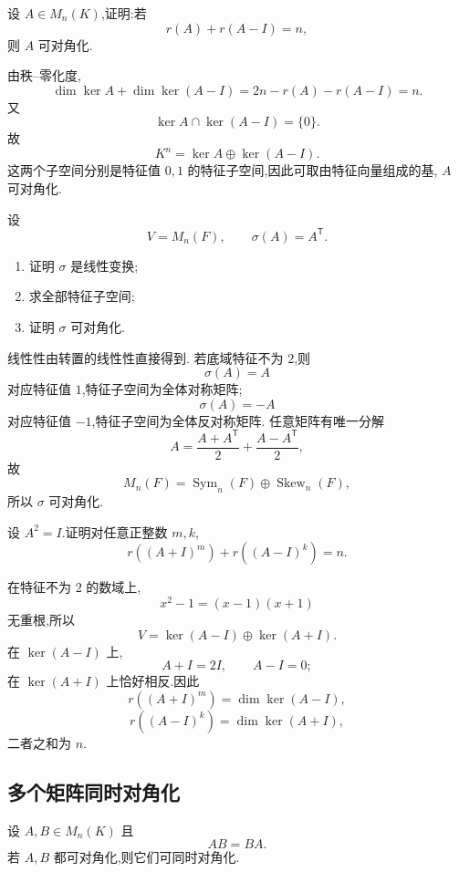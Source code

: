 \begin{example}
设 $A\in M_n(K)$,证明:若
\[
r(A)+r(A-I)=n,
\]
则 $A$ 可对角化.
\end{example}
\exampleblank

\begin{solution}
由秩--零化度,
\[
\dim\ker A+\dim\ker(A-I)
=
2n-r(A)-r(A-I)=n.
\]
又
\[
\ker A\cap\ker(A-I)=\{0\}.
\]
故
\[
K^n=\ker A\oplus\ker(A-I).
\]
这两个子空间分别是特征值 $0,1$ 的特征子空间,因此可取由特征向量组成的基,
$A$ 可对角化.
\end{solution}


\begin{example}
设
\[
V=M_n(F),
\qquad
\sigma(A)=A^{\mathsf T}.
\]
\begin{enumerate}
    \item 证明 $\sigma$ 是线性变换;
    \item 求全部特征子空间;
    \item 证明 $\sigma$ 可对角化.
\end{enumerate}
\end{example}
\exampleblank

\begin{solution}
线性性由转置的线性性直接得到.
若底域特征不为 $2$,则
\[
\sigma(A)=A
\]
对应特征值 $1$,特征子空间为全体对称矩阵;
\[
\sigma(A)=-A
\]
对应特征值 $-1$,特征子空间为全体反对称矩阵.
任意矩阵有唯一分解
\[
A=
\dfrac{A+A^{\mathsf T}}{2}
+
\dfrac{A-A^{\mathsf T}}{2},
\]
故
\[
M_n(F)
=
\operatorname{Sym}_n(F)
\oplus
\operatorname{Skew}_n(F),
\]
所以 $\sigma$ 可对角化.
\end{solution}


\begin{example}
设 $A^2=I$.证明对任意正整数 $m,k$,
\[
r((A+I)^m)+r((A-I)^k)=n.
\]
\end{example}
\exampleblank

\begin{solution}
在特征不为 $2$ 的数域上,
\[
x^2-1=(x-1)(x+1)
\]
无重根,所以
\[
V=\ker(A-I)\oplus\ker(A+I).
\]
在 $\ker(A-I)$ 上,
\[
A+I=2I,\qquad A-I=0;
\]
在 $\ker(A+I)$ 上恰好相反.因此
\[
r((A+I)^m)=\dim\ker(A-I),
\]
\[
r((A-I)^k)=\dim\ker(A+I),
\]
二者之和为 $n$.
\end{solution}


\subsection{多个矩阵同时对角化}

\begin{proposition}[\markstar]
设 $A,B\in M_n(K)$ 且
\[
AB=BA.
\]
若 $A,B$ 都可对角化,则它们可同时对角化.
\end{proposition}


